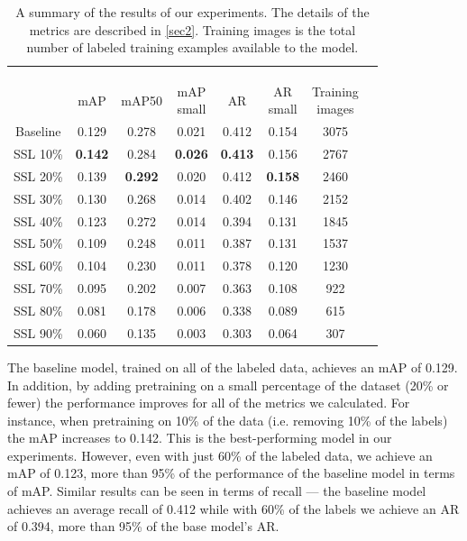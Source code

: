 \documentclass[conference]{IEEEtran}
\begin{document}

\begin{table}[t]
\renewcommand{\arraystretch}{1.3}
\caption{A summary of the results of our experiments. The details of the metrics are described in \ref{sec2}. Training images is the total number of labeled training examples available to the model.}
\label{tab:results}
\centering
\begin{tabular}{|c|c|c|c|c|c|c|c}
\hline
\begin{minipage}{5mm} ~\\ \\ \\ \end{minipage} & mAP & mAP50 & \parbox[c]{7mm}{mAP\\small} & AR & \parbox[c]{7mm}{AR\\small} & \parbox[c]{9mm}{Training\\images} \\ \hline \hline
{}
Baseline & 0.129 & 0.278 & 0.021 & 0.412 & 0.154 & 3075 \\ \hline
SSL 10\% & \textbf{0.142} & 0.284 & \textbf{0.026} & \textbf{0.413} & 0.156 & 2767 \\ \hline
SSL 20\% & 0.139 & \textbf{0.292} & 0.020 & 0.412 & \textbf{0.158} & 2460 \\ \hline
SSL 30\% & 0.130 & 0.268 & 0.014 & 0.402 & 0.146 & 2152 \\ \hline
SSL 40\% & 0.123 & 0.272 & 0.014 & 0.394 & 0.131 & 1845 \\ \hline
{}
SSL 50\% & 0.109 & 0.248 & 0.011 & 0.387 & 0.131 & 1537 \\ \hline
SSL 60\% & 0.104 & 0.230 & 0.011 & 0.378 & 0.120 & 1230 \\ \hline
SSL 70\% & 0.095 & 0.202 & 0.007 & 0.363 & 0.108 & 922 \\ \hline
SSL 80\% & 0.081 & 0.178 & 0.006 & 0.338 & 0.089 & 615 \\ \hline
SSL 90\% & 0.060 & 0.135 & 0.003 & 0.303 & 0.064 & 307 \\
\hline
\end{tabular}
\end{table}

The baseline model, trained on all of the labeled data, achieves an mAP of 0.129. In addition, by adding pretraining on a small percentage of the dataset (20\% or fewer) the performance improves for all of the metrics we calculated. For instance, when pretraining on 10\% of the data (i.e. removing 10\% of the labels) the mAP increases to 0.142. This is the best-performing model in our experiments. However, even with just 60\% of the labeled data, we achieve an mAP of 0.123, more than 95\% of the performance of the baseline model in terms of mAP. Similar results can be seen in terms of recall — the baseline model achieves an average recall of 0.412 while with 60\% of the labels we achieve an AR of 0.394, more than 95\% of the base model's AR.
\end{document}
